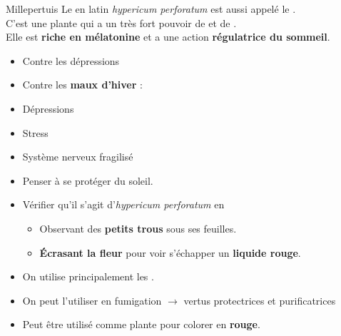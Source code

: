 \ficheidentiteplante
{Millepertuis}
{%
    Le  en latin \textit{hypericum perforatum} est aussi appelé le .\\

    C'est une plante qui a un très fort pouvoir de  et de .\\
    Elle est \textbf{riche en mélatonine} et a une action \textbf{régulatrice du sommeil}.
}
{%
    \begin{itemize}[label=\bcoutil]
        \item Contre les dépressions
        \item Contre les \textbf{maux d'hiver} : \\
        \item Dépressions 
        \item Stress
        \item Système nerveux fragilisé
    \end{itemize}
}
{%
    \begin{itemize}[label=\faPen]
        \item Penser à se protéger du soleil.
        \item Vérifier qu'il s'agit d'\textit{hypericum perforatum} en \\
                \begin{itemize}[label = \bcoeil]
                    \item Observant des \textbf{petits trous} sous ses feuilles.
                    \item \textbf{\'Ecrasant la fleur} pour voir s'échapper un \textbf{liquide rouge}. 
                \end{itemize}
    \end{itemize}
}
{%
    \begin{itemize}[label = \bcplume]
        \item On utilise principalement les .
        \item On peut l'utiliser en fumigation $\longrightarrow$ vertus protectrices et purificatrices
        \item Peut être utilisé comme plante  pour colorer en \textbf{rouge}.
    \end{itemize}
}
